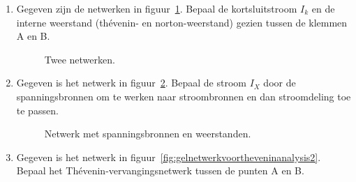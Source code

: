 \begin{enumerate}[labelindent=0pt,labelwidth=\widthof{8.88.\ },label=\textbf{\thechapter.\arabic*.},leftmargin=!,ref=\thechapter.\arabic*]
\item 
\label{que:gelthevenin6}
Gegeven zijn de netwerken in figuur~\ref{fig:gelthevenin6}. Bepaal de kortsluitstroom $I_k$ en de interne weerstand (th\'evenin- en norton-weerstand) gezien tussen de klemmen A en B.

\begin{figure}[!ht]
\centering
{}
\caption{Twee netwerken.}
\label{fig:gelthevenin6}
\end{figure}


\item
\label{que:gelthevenin5}
Gegeven is het netwerk in figuur~\ref{fig:gelthevenin3}. Bepaal de stroom $I_X$ door de spanningsbronnen om te werken naar stroombronnen en dan stroomdeling toe te passen.

\begin{figure}[!ht]
\centering
{}
\caption{Netwerk met spanningsbronnen en weerstanden.}
\label{fig:gelthevenin3}
\end{figure}


\item
\label{que:gelthevenin2}
Gegeven is het netwerk in figuur~\ref{fig:gelnetwerkvoortheveninanalysis2}. Bepaal het Thévenin-vervangingsnetwerk tussen de punten A en B. 


\end{enumerate}
